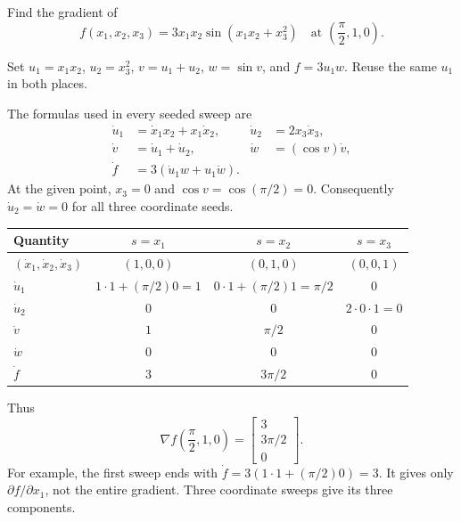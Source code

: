 \clearpage
\begin{example}
Find the gradient of
\[
 f(x_1,x_2,x_3)=3x_1x_2\sin(x_1x_2+x_3^2)
 \quad\text{at }\left(\frac\pi2,1,0\right).
\]
\end{example}
Set $u_1=x_1x_2$, $u_2=x_3^2$, $v=u_1+u_2$, $w=\sin v$, and $f=3u_1w$. Reuse the same $u_1$ in both places.
\begin{center}
\end{center}
The formulas used in every seeded sweep are
\begin{align*}
 \dot u_1&=\dot x_1x_2+x_1\dot x_2,&
 \dot u_2&=2x_3\dot x_3,\\
 \dot v&=\dot u_1+\dot u_2,&
 \dot w&=(\cos v)\dot v,\\
 \dot f&=3(\dot u_1w+u_1\dot w).
\end{align*}
At the given point, $x_3=0$ and $\cos v=\cos(\pi/2)=0$. Consequently $\dot u_2=\dot w=0$ for all three coordinate seeds.
\begin{center}
\renewcommand{\arraystretch}{1.35}
\begin{tabular}{lccc}
\toprule
Quantity & $s=x_1$ & $s=x_2$ & $s=x_3$\\
\midrule
$(\dot x_1,\dot x_2,\dot x_3)$ & $(1,0,0)$ & $(0,1,0)$ & $(0,0,1)$\\
$\dot u_1$ & $1\cdot1+(\pi/2)0=1$ & $0\cdot1+(\pi/2)1=\pi/2$ & $0$\\
$\dot u_2$ & $0$ & $0$ & $2\cdot0\cdot1=0$\\
$\dot v$ & $1$ & $\pi/2$ & $0$\\
$\dot w$ & $0$ & $0$ & $0$\\
$\dot f$ & $3$ & $3\pi/2$ & $0$\\
\bottomrule
\end{tabular}
\end{center}
Thus
\[
 \boxed{\nabla f\left(\frac\pi2,1,0\right)=\begin{bmatrix}3\\3\pi/2\\0\end{bmatrix}.}
\]
For example, the first sweep ends with $\dot f=3(1\cdot1+(\pi/2)0)=3$. It gives only $\partial f/\partial x_1$, not the entire gradient. Three coordinate sweeps give its three components.


